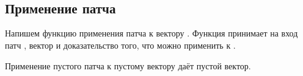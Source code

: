 \begin{code}%
\>[0]\<[4]%
\>[4] \AgdaSymbol{:}  \AgdaSymbol{\{}\AgdaSymbol{\}\{} \AgdaSymbol{:}  \AgdaSymbol{\}\{} \AgdaSymbol{:}  \AgdaSymbol{\}\{} \AgdaSymbol{:}   \AgdaSymbol{\}}\<%
\\
\>[4]\<[6]%
\>[6] \AgdaSymbol{(}  \AgdaSymbol{:} \AgdaSymbol{)}\<%
\\
\>[4]\<[6]%
\>[6]     \AgdaSymbol{(}     \AgdaSymbol{)}  \AgdaSymbol{(}  \AgdaSymbol{)}\<%
\end{code}

\subsection{Применение патча}

Напишем функцию применения патча  к вектору
. Функция принимает на вход патч , вектор
 и доказательство того, что  можно применить
к .

\begin{code}%
\>[0]\<[2]%
\>[2] \AgdaSymbol{:}  \AgdaSymbol{\{}\AgdaSymbol{\}\{} \AgdaSymbol{:}  \AgdaSymbol{\}}  \AgdaSymbol{(} \AgdaSymbol{:}  \AgdaSymbol{)}  \AgdaSymbol{(} \AgdaSymbol{:}   \AgdaSymbol{)}        \<%
\end{code}

Применение пустого патча к пустому вектору даёт пустой вектор.

\begin{code}%
\>[0]\<[2]%
\>[2]  \AgdaInductiveConstructor{[]}  \AgdaSymbol{=} \AgdaInductiveConstructor{[]}\<%
\end{code}

